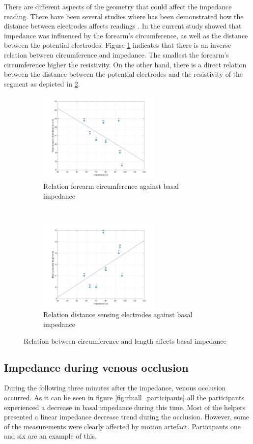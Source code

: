 There are different aspects of the geometry that could affect the impedance reading. There have been several studies where has been demonstrated how the distance between electrodes affects readings . In the current study showed that impedance was influenced by the forearm's circumference, as well as the distance between the potential electrodes. Figure \ref{fig:C_vs_Z} indicates that there is an inverse relation between circumference and impedance. The smallest the forearm's circumference higher the resistivity. On the other hand, there is a direct relation between the distance between the potential electrodes and the resistivity of the segment as depicted in \ref{fig:l_vs_Z}.

\begin{figure}[t!]
	\centering
	\begin{subfigure}[t]{0.5\textwidth}
		\centering
		\includegraphics[height=4.5cm]{figure2a}
		\caption{Relation forearm circumference against basal impedance}
		\label{fig:C_vs_Z}
	\end{subfigure}%
	~ 
	\begin{subfigure}[t]{0.5\textwidth}
		\centering
		\includegraphics[height=4.5cm]{figure2b}
		\caption{Relation distance sensing electrodes against basal impedance}
		\label{fig:l_vs_Z}
	\end{subfigure}
	\caption{Relation between circumference and length affects basal impedance}
	\label{fig:relation_geometry_vs_impedance}
\end{figure}

\subsection{Impedance during venous occlusion}
\label{section5.1.2}
During the following three minutes after the impedance, venous occlusion occurred. As it can be seen in figure \ref{fig:rb:all_participants} all the participants experienced a decrease in basal impedance during this time. Most of the helpers presented a linear impedance decrease trend during the occlusion. However, some of the measurements were clearly affected by motion artefact. Participants one and six are an example of this. 


